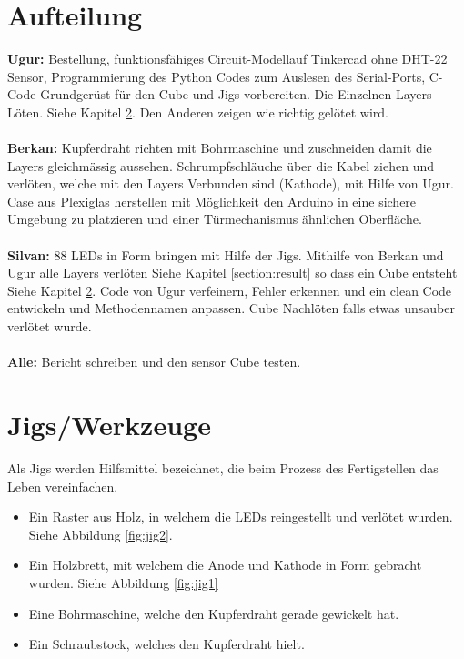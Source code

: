 \documentclass{article}
\begin{document}
\section{Aufteilung}
\textbf{Ugur:} Bestellung, funktionsfähiges \glqq Circuit-Modell\grqq auf Tinkercad ohne DHT-22 Sensor, Programmierung des Python Codes zum Auslesen des Serial-Ports, C-Code Grundgerüst für den Cube und Jigs vorbereiten. Die Einzelnen Layers Löten. Siehe Kapitel \ref{section:Jigs}. Den Anderen zeigen wie richtig gelötet wird.\\ \\
\textbf{Berkan:} Kupferdraht richten mit Bohrmaschine und zuschneiden damit die Layers gleichmässig aussehen. Schrumpfschläuche über die Kabel ziehen und verlöten, welche mit den Layers Verbunden sind (Kathode), mit Hilfe von Ugur. Case aus Plexiglas herstellen mit Möglichkeit den Arduino in eine sichere Umgebung zu platzieren und einer Türmechanismus ähnlichen Oberfläche. \\ \\ \textbf{Silvan:} 88 LEDs in Form bringen mit Hilfe der Jigs. Mithilfe von Berkan und Ugur alle Layers verlöten Siehe Kapitel \ref{section:result} so dass ein Cube entsteht Siehe Kapitel \ref{section:Jigs}. Code von Ugur verfeinern, Fehler erkennen und ein clean Code entwickeln und Methodennamen anpassen. Cube Nachlöten falls etwas unsauber verlötet wurde. \\ \\
\textbf{Alle:} Bericht schreiben und den sensor Cube testen. 

\section{Jigs/Werkzeuge}
\label{section:Jigs}
Als Jigs werden Hilfsmittel bezeichnet, die beim Prozess des Fertigstellen das Leben vereinfachen. 
\begin{itemize}
\item Ein Raster aus Holz, in welchem die LEDs reingestellt und verlötet wurden. Siehe Abbildung \ref{fig:jig2}.
\item Ein Holzbrett, mit welchem die Anode und Kathode in Form gebracht wurden. Siehe Abbildung \ref{fig:jig1}
\item Eine Bohrmaschine, welche den Kupferdraht gerade gewickelt hat.
\item Ein Schraubstock, welches den Kupferdraht hielt.   
\end{itemize}
\end{document}

